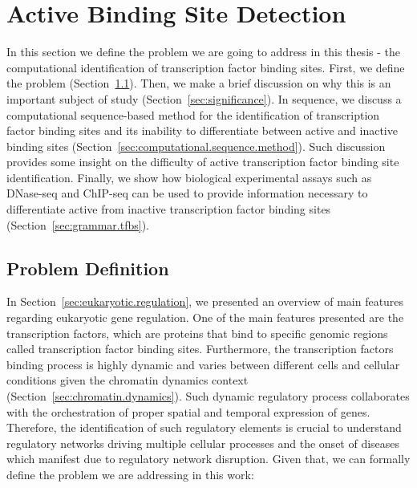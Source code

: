 \section{Active Binding Site Detection}
\label{sec:active.binding.site.detection}

In this section we define the problem we are going to address in this thesis - the computational identification of transcription factor binding sites. First, we define the problem (Section~\ref{sec:problem.definition}). Then, we make a brief discussion on why this is an important subject of study (Section~\ref{sec:significance}). In sequence, we discuss a computational sequence-based method for the identification of transcription factor binding sites and its inability to differentiate between active and inactive binding sites (Section~\ref{sec:computational.sequence.method}). Such discussion provides some insight on the difficulty of active transcription factor binding site identification. Finally, we show how biological experimental assays such as DNase-seq and ChIP-seq can be used to provide information necessary to differentiate active from inactive transcription factor binding sites (Section~\ref{sec:grammar.tfbs}).

\subsection{Problem Definition}
\label{sec:problem.definition}

In Section~\ref{sec:eukaryotic.regulation}, we presented an overview of main features regarding eukaryotic gene regulation. One of the main features presented are the transcription factors, which are proteins that bind to specific genomic regions called transcription factor binding sites. Furthermore, the transcription factors binding process is highly dynamic and varies between different cells and cellular conditions given the chromatin dynamics context (Section~\ref{sec:chromatin.dynamics}). Such dynamic regulatory process collaborates with the orchestration of proper spatial and temporal expression of genes. Therefore, the identification of such regulatory elements is crucial to understand regulatory networks driving multiple cellular processes and the onset of diseases which manifest due to regulatory network disruption. Given that, we can formally define the problem we are addressing in this work:

